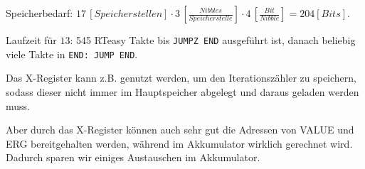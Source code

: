 \documentclass{CInf_practice}
\begin{document}


Speicherbedarf: $17\, \left[Speicherstellen\right] \cdot 3\, \left[\frac{Nibbles}{Speicherstelle}\right] \cdot 4\, \left[\frac{Bit}{Nibble}\right] = 204 \left[Bits\right]$.

Laufzeit für $13$: 545 RTeasy Takte bis \texttt{JUMPZ END} ausgeführt ist, danach beliebig viele Takte in \texttt{END: JUMP END}. 

Das X-Register kann z.B. genutzt werden, um den Iterationszähler zu speichern,
sodass dieser nicht immer im Hauptspeicher abgelegt und daraus geladen werden
muss.

Aber durch das X-Register können auch sehr gut die Adressen von VALUE und ERG 
bereitgehalten werden, während im Akkumulator wirklich gerechnet wird. 
Dadurch sparen wir einiges Austauschen im Akkumulator.
\end{document}
